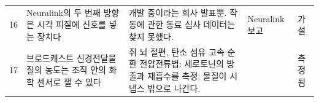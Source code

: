 {\begin{longtable}{>{\raggedright}p{0.5cm}>{\raggedright}p{4.0cm}>{\raggedright}p{5.6cm}>{\raggedright}p{2.3cm}>{\raggedright\arraybackslash}p{1.7cm}}
16 & Neuralink의 두 번째 방향은 시각 피질에 신호를 넣는 장치다 & 개발 중이라는 회사 발표뿐. 작동에 관한 동료 심사 데이터는 찾지 못했다. & Neuralink 보고 & 가설 \\
17 & 브로드캐스트 신경전달물질의 농도는 조직 안의 화학 센서로 잴 수 있다 & 쥐 뇌 절편, 탄소 섬유 고속 순환 전압전류법: 세로토닌의 방출과 재흡수를 측정; 물질이 시냅스 밖으로 나간다. & \cite{Bunin1998} & 측정됨 \\
\bottomrule
\end{longtable}}
